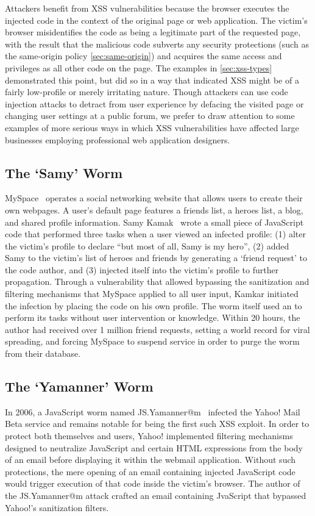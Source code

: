 Attackers benefit from XSS vulnerabilities because the browser executes the injected code in the context of the original page or web application.
The victim's browser misidentifies the code as being a legitimate part of the requested page, with the result that the malicious code subverts any security protections (such as the same-origin policy \autoref{sec:same-origin}) and acquires the same access and privileges as all other code on the page.
The examples in \autoref{sec:xss-types} demonstrated this point, but did so in a way that indicated XSS might be of a fairly low-profile or merely irritating nature.
Though attackers can use code injection attacks to detract from user experience by defacing the visited page or changing user settings at a public forum, we prefer to draw attention to some examples of more serious ways in which XSS vulnerabilities have affected large businesses employing professional web application designers.

\subsection{The `Samy' Worm}
MySpace~\cite{myspace} operates a social networking website that allows users to create their own webpages.
A user's default page features a friends list, a heroes list, a blog, and shared profile information.
Samy Kamak~\cite{samy} wrote a small piece of JavaScript code that performed three tasks when a user viewed an infected profile: (1) alter the victim's profile to declare ``but most of all, Samy is my hero'', (2) added Samy to the victim's list of heroes and friends by generating a `friend request' to the code author, and (3) injected itself into the victim's profile to further propagation.
Through a vulnerability that allowed bypassing the sanitization and filtering mechanisms that MySpace applied to all user input, Kamkar initiated the infection by placing the code on his own profile.
The worm itself used an  to perform its tasks without user intervention or knowledge.
Within 20 hours, the author had received over 1 million friend requests, setting a world record for viral spreading, and forcing MySpace to suspend service in order to purge the worm from their database.

\subsection{The `Yamanner' Worm}
In 2006, a JavaScript worm named JS.Yamanner@m~\cite{yamanner} infected the Yahoo! Mail Beta service and remains notable for being the first such XSS exploit.
In order to protect both themselves and users, Yahoo! implemented filtering mechanisms designed to neutralize JavaScript and certain HTML expressions from the body of an email before displaying it within the webmail application.
Without such protections, the mere opening of an email containing injected JavaScript code would trigger execution of that code inside the victim's browser.
The author of the JS.Yamanner@m attack crafted an email containing JvaScript that bypassed Yahoo!'s sanitization filters.


